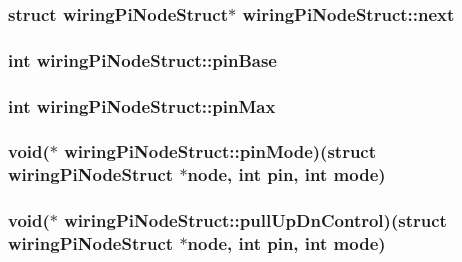 \hypertarget{structwiringPiNodeStruct_aea1a1994ed51b0dca743cc5a5a796adf}{
\subsubsection[{next}]{\setlength{\rightskip}{0pt plus 5cm}struct {\bf wiring\-Pi\-Node\-Struct}$\ast$ wiring\-Pi\-Node\-Struct\-::next}}\label{structwiringPiNodeStruct_aea1a1994ed51b0dca743cc5a5a796adf}
\hypertarget{structwiringPiNodeStruct_a46172e5221f43279c33fe1501bb82464}{
\subsubsection[{pin\-Base}]{\setlength{\rightskip}{0pt plus 5cm}int wiring\-Pi\-Node\-Struct\-::pin\-Base}}\label{structwiringPiNodeStruct_a46172e5221f43279c33fe1501bb82464}
\hypertarget{structwiringPiNodeStruct_aa3ca7fa9e518341e54d891a5ba4cd1db}{
\subsubsection[{pin\-Max}]{\setlength{\rightskip}{0pt plus 5cm}int wiring\-Pi\-Node\-Struct\-::pin\-Max}}\label{structwiringPiNodeStruct_aa3ca7fa9e518341e54d891a5ba4cd1db}
\hypertarget{structwiringPiNodeStruct_a7aa4cd39c2aa600e88897712f1ec710f}{
\subsubsection[{pin\-Mode}]{\setlength{\rightskip}{0pt plus 5cm}void($\ast$ wiring\-Pi\-Node\-Struct\-::pin\-Mode)(struct {\bf wiring\-Pi\-Node\-Struct} $\ast$node, int pin, int {\bf mode})}}\label{structwiringPiNodeStruct_a7aa4cd39c2aa600e88897712f1ec710f}
\hypertarget{structwiringPiNodeStruct_a23c17c9318ce3169990ed0c043b99dbc}{
\subsubsection[{pull\-Up\-Dn\-Control}]{\setlength{\rightskip}{0pt plus 5cm}void($\ast$ wiring\-Pi\-Node\-Struct\-::pull\-Up\-Dn\-Control)(struct {\bf wiring\-Pi\-Node\-Struct} $\ast$node, int pin, int {\bf mode})}}\label{structwiringPiNodeStruct_a23c17c9318ce3169990ed0c043b99dbc}
